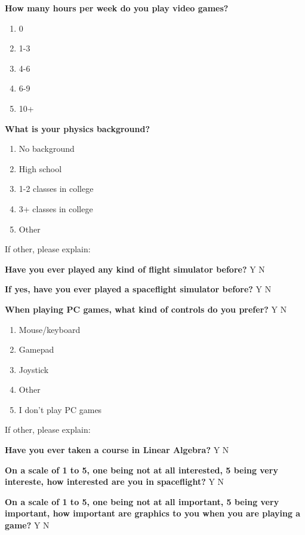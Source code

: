 \vspace{5mm}
\noindent\textbf{How many hours per week do you play video games?}
\begin{enumerate}
  \item 0
  \item 1-3
  \item 4-6
  \item 6-9
  \item 10+
\end{enumerate}

\vspace{5mm}
\noindent\textbf{What is your physics background?}
\begin{enumerate}
  \item No background
  \item High school
  \item 1-2 classes in college
  \item 3+ classes in college
  \item Other
\end{enumerate}
If other, please explain:

\vspace{5mm}
\noindent\textbf{Have you ever played any kind of flight simulator before?} Y N

\vspace{5mm}
\noindent\textbf{If yes, have you ever played a spaceflight simulator before?} Y N

\vspace{5mm}
\noindent\textbf{When playing PC games, what kind of controls do you prefer?} Y N
\begin{enumerate}
  \item Mouse/keyboard
  \item Gamepad
  \item Joystick
  \item Other
  \item I don’t play PC games
\end{enumerate}
If other, please explain:

\vspace{5mm}
\noindent\textbf{Have you ever taken a course in Linear Algebra?} Y N

\vspace{5mm}
\noindent\textbf{On a scale of 1 to 5, one being not at all interested, 5 being very intereste, how interested are you in spaceflight?} Y N

\vspace{5mm}
\noindent\textbf{On a scale of 1 to 5, one being not at all important, 5 being very important, how important are graphics to you when you are playing a game?} Y N

